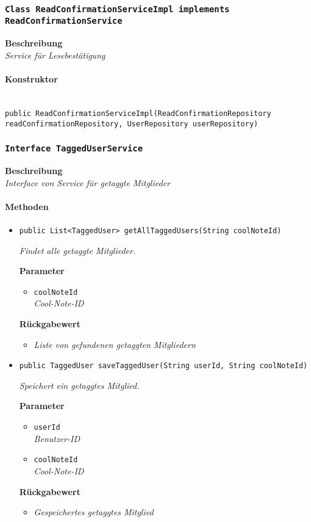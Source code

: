     \subsubsection{\texttt{Class ReadConfirmationServiceImpl implements ReadConfirmationService}}
     \textbf{Beschreibung} \\
     \textit{Service für Lesebestätigung}
     \paragraph*{Konstruktor}\mbox{} \\
     \texttt{public ReadConfirmationServiceImpl(ReadConfirmationRepository readConfirmationRepository, UserRepository userRepository)}
     \subsubsection{\texttt{Interface TaggedUserService}}
     \textbf{Beschreibung} \\
     \textit{Interface von Service für getaggte Mitglieder}
     \paragraph*{Methoden}
     \begin{itemize}
     	\item{\texttt{public List<TaggedUser> getAllTaggedUsers(String coolNoteId)}}
     	
     	\textit{Findet alle getaggte Mitglieder.}
     	
     	\textbf{Parameter}
     	\begin{itemize}
     		\item\texttt{coolNoteId}\\
     		\textit{Cool-Note-ID}
     	\end{itemize}
     	
     	\textbf{Rückgabewert}
     	\begin{itemize}
     		\item\textit{Liste von gefundenen getaggten Mitgliedern }
     	\end{itemize}
     
     \item{\texttt{public TaggedUser saveTaggedUser(String userId, String coolNoteId)}}
     	
     	\textit{Speichert ein getaggtes Mitglied.}
     	
     	\textbf{Parameter}
     	\begin{itemize}
     		\item\texttt{userId}\\
     		\textit{Benutzer-ID}
     		\item\texttt{coolNoteId}\\
     		\textit{Cool-Note-ID}
     	\end{itemize}
     	
     	\textbf{Rückgabewert}
     	\begin{itemize}
     		\item\textit{Gespeichertes getaggtes Mitglied}
     	\end{itemize}
     \end{itemize}
 
